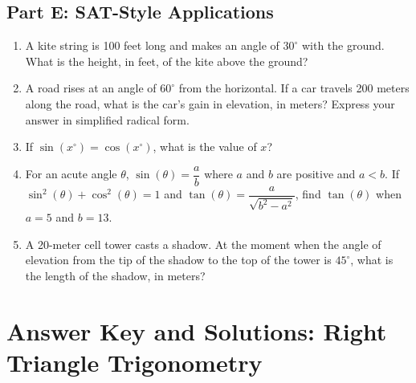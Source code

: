 \documentclass[14pt]{extarticle}
\begin{document}
\subsection*{Part E: SAT-Style Applications}
\begin{enumerate}
  \item A kite string is 100 feet long and makes an angle of \(30^\circ\) with the ground. What is the height, in feet, of the kite above the ground?
  \item A road rises at an angle of \(60^\circ\) from the horizontal. If a car travels 200 meters along the road, what is the car's gain in elevation, in meters? Express your answer in simplified radical form.
  \item If \(\sin(x^\circ) = \cos(x^\circ)\), what is the value of \(x\)?
  \item For an acute angle \(\theta\), \(\sin(\theta) = \dfrac{a}{b}\) where \(a\) and \(b\) are positive and \(a < b\). If \(\sin^2(\theta) + \cos^2(\theta) = 1\) and \(\tan(\theta) = \dfrac{a}{\sqrt{b^2 - a^2}}\), find \(\tan(\theta)\) when \(a = 5\) and \(b = 13\).
  \item A 20-meter cell tower casts a shadow. At the moment when the angle of elevation from the tip of the shadow to the top of the tower is \(45^\circ\), what is the length of the shadow, in meters?
\end{enumerate}

\newpage

\section*{Answer Key and Solutions: Right Triangle Trigonometry}
\end{document}
